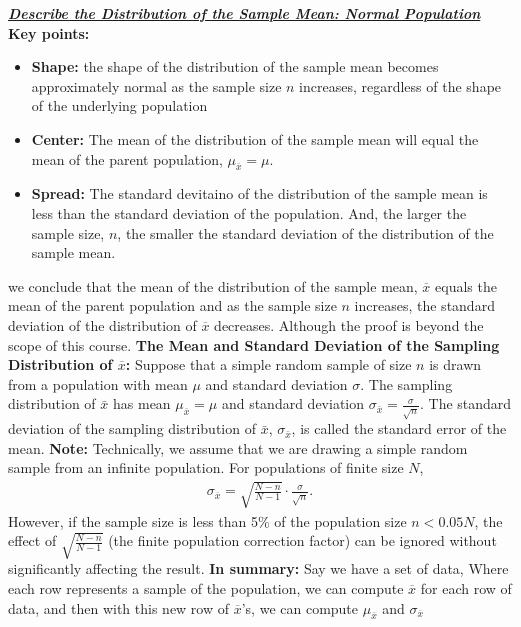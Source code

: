 \documentclass{report}
\begin{document}
    \pagebreak \bigbreak \noindent 
    \textbf{\textit{\underline{Describe the Distribution of the Sample Mean: Normal Population}}}
    \bigbreak \noindent 
    \textbf{Key points:}
    \begin{itemize}
        \item \textbf{Shape:} the shape of the distribution of the sample mean becomes approximately normal as the sample size $n $ increases, regardless of the shape of the underlying population
        \item \textbf{Center:} The mean of the distribution of the sample mean will equal the mean of the parent population, $\mu_{\overline{x}} = \mu $.
        \item \textbf{Spread:} The standard devitaino of the distribution of the sample mean is less than the standard deviation of the population. And, the larger the sample size, $n $, the smaller the standard deviation of the distribution of the sample mean.
    \end{itemize}
    we conclude that the mean of the distribution of the sample mean, $\overline{x} $ equals the mean of the parent population and as the sample size $n $ increases, the standard deviation of the distribution of $\overline{x} $ decreases. Although the proof is beyond the scope of this course. 
    \bigbreak \noindent 
    \textbf{The Mean and Standard Deviation of the Sampling Distribution of $\overline{x} $:}
    \bigbreak \noindent 
    Suppose that a simple random sample of size $n $ is drawn from a population with mean $\mu$ and standard deviation $\sigma$. The sampling distribution of $\bar{x}$ has mean $\mu_{\bar{x}} = \mu$ and standard deviation $\sigma_{\bar{x}} = \frac{\sigma}{\sqrt{n}}$. The standard deviation of the sampling distribution of $\bar{x}$, $\sigma_{\bar{x}}$, is called the standard error of the mean.
    \bigbreak \noindent 
    \textbf{Note:} Technically, we assume that we are drawing a simple random sample from an infinite population. For populations of finite size \(N\), 
    \begin{align*}
        \sigma_{\overline{x}} = \sqrt{\frac{N-n}{N-1}} \cdot \frac{\sigma}{\sqrt{n}}
    .\end{align*}
     However, if the sample size is less than 5\% of the population size $n < 0.05N$, the effect of $\sqrt{\frac{N - n}{N - 1}}$ (the finite population correction factor) can be ignored without significantly affecting the result.
     \bigbreak \noindent 
     \textbf{In summary:}
     \bigbreak \noindent 
     Say we have a set of data, Where each row represents a sample of the population, we can compute $\overline{x} $ for each row of data, and then with this new row of $\overline{x}$'s, we can compute $\mu_{\overline{x}}$ and $\sigma_{\overline{x}}$
\end{document}
